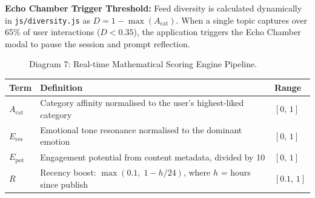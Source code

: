 \documentclass[11pt, a4paper]{article}
\begin{document}
\textbf{Echo Chamber Trigger Threshold:} Feed diversity is calculated dynamically in \texttt{js/diversity.js} as $D = 1 - \max(A_{\text{cat}})$. When a single topic captures over 65\% of user interactions ($D < 0.35$), the application triggers the Echo Chamber modal to pause the session and prompt reflection.

\begin{figure}[htpb]
    \centering
    \caption{Diagram 7: Real-time Mathematical Scoring Engine Pipeline.}
    \label{fig:scoring_pipeline}
\end{figure}

\vspace{4pt}
\begin{center}
\renewcommand{\arraystretch}{1.3}
\begin{tabularx}{0.94\textwidth}{>{\bfseries}l X l}
\toprule
Term & Definition & Range \\
\midrule
$A_{\text{cat}}$ & Category affinity normalised to the user's highest-liked category & $[0,\,1]$ \\
$E_{\text{res}}$ & Emotional tone resonance normalised to the dominant emotion & $[0,\,1]$ \\
$E_{\text{pot}}$ & Engagement potential from content metadata, divided by 10 & $[0,\,1]$ \\
$R$ & Recency boost: $\max(0.1,\;1 - h/24)$, where $h$ = hours since publish & $[0.1,\,1]$ \\
\bottomrule
\end{tabularx}
\end{center}
\end{document}
